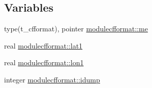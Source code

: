 \subsection*{Variables}
\begin{DoxyCompactItemize}
\item 
type(t\+\_\+cfformat), pointer \mbox{\hyperlink{namespacemodulecfformat_a76d190b893ca0f5aa943e57206a96b4b}{modulecfformat\+::me}}
\item 
real \mbox{\hyperlink{namespacemodulecfformat_ab2d59020a88c3fbe79eff641f5173e89}{modulecfformat\+::lat1}}
\item 
real \mbox{\hyperlink{namespacemodulecfformat_aadafc108edb5e219d2dd0fa0e0e650c4}{modulecfformat\+::lon1}}
\item 
integer \mbox{\hyperlink{namespacemodulecfformat_ab5d33d2291e08b59db8c41277c58ea06}{modulecfformat\+::idump}}
\end{DoxyCompactItemize}

